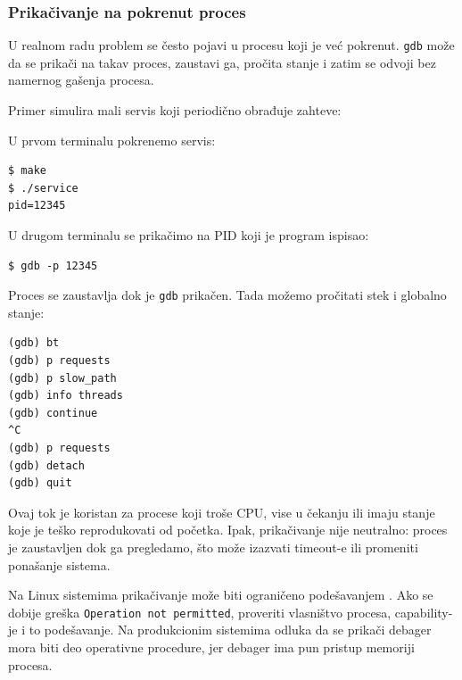 \subsubsection{Prikačivanje na pokrenut proces}\label{gdb-attach-process}

U realnom radu problem se često pojavi u procesu koji je već pokrenut. \texttt{gdb} može da se prikači na takav proces, zaustavi ga, pročita stanje i zatim se odvoji bez namernog gašenja procesa.

Primer simulira mali servis koji periodično obrađuje zahteve:


U prvom terminalu pokrenemo servis:

\begin{verbatim}
$ make
$ ./service
pid=12345
\end{verbatim}

U drugom terminalu se prikačimo na PID koji je program ispisao:

\begin{verbatim}
$ gdb -p 12345
\end{verbatim}

Proces se zaustavlja dok je \texttt{gdb} prikačen. Tada možemo pročitati stek i globalno stanje:

\begin{verbatim}
(gdb) bt
(gdb) p requests
(gdb) p slow_path
(gdb) info threads
(gdb) continue
^C
(gdb) p requests
(gdb) detach
(gdb) quit
\end{verbatim}

Ovaj tok je koristan za procese koji troše CPU, vise u čekanju ili imaju stanje koje je teško reprodukovati od početka. Ipak, prikačivanje nije neutralno: proces je zaustavljen dok ga pregledamo, što može izazvati timeout-e ili promeniti ponašanje sistema.

Na Linux sistemima prikačivanje može biti ograničeno podešavanjem . Ako se dobije greška \texttt{Operation not permitted}, proveriti vlasništvo procesa, capability-je i to podešavanje. Na produkcionim sistemima odluka da se prikači debager mora biti deo operativne procedure, jer debager ima pun pristup memoriji procesa.
